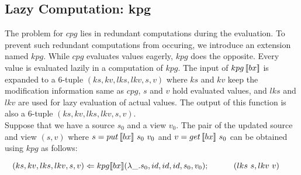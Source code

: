 



\subsection{Lazy Computation: kpg}

The problem for $cpg$ lies in redundant computations during the evaluation. To prevent such redundant computations from occuring, we introduce an extension named $kpg$. While $cpg$ evaluates values eagerly, $kpg$ does the opposite. Every value is evaluated lazily in a computation of $kpg$. The input of $kpg \, [\![bx]\!]$ is expanded to a 6-tuple $(ks, kv, lks, lkv, s, v)$ where $ks$ and $kv$ keep the modification information same as $cpg$, $s$ and $v$ hold evaluated values, and $lks$ and $lkv$ are used for lazy evaluation of actual values. The output of this function is also a 6-tuple $(ks, kv, lks, lkv, s, v)$.\\
Suppose that we have a source $s_0$ and a view $v_0$. The pair of the updated source and view $(s, v)$ where $s = put \, [\![bx]\!] \ s_0 \ v_0$ and $v = get \, [\![bx]\!] \ s_0$ can be obtained using $kpg$ as follows:

\smallvspace
    $\tab (ks, kv, lks, lkv, s, v) \Leftarrow \kpg{bx}{\lambda \_.s_0}{id}{id}{id}{s_0}{v_0};\\
        \tab \qtab (lks \ s, lkv \ v)$
\smallvspace
        
